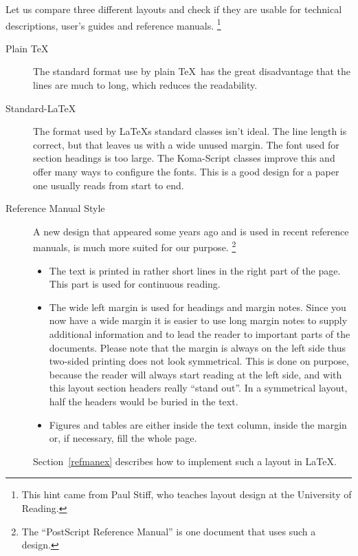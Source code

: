 \documentclass[twoside,a4paper]{refart}
\begin{document}
Let us compare three different layouts and check if they are usable for 
technical descriptions, user's guides and reference manuals.  
\footnote{This hint came from Paul Stiff, who teaches layout design at 
the University of Reading.}

\begin{description}

\item[Plain \TeX]
        The standard format use by plain \TeX\ has the great disadvantage 
        that the lines are much to long, which reduces the readability.
        
\item[Standard-\LaTeX]
        The format used by \LaTeX{}s standard classes isn't ideal. The 
        line length is correct, but that leaves us with a wide unused margin. 
        The font used for section headings is too large. The Koma-Script 
        classes improve this and offer many ways to configure the fonts. 
        This is a good design for a paper one usually reads from start to 
        end.
        
\item[Reference Manual Style]
        A new design that appeared some years ago and is used in recent 
        reference manuals, is much more suited for our purpose.
        \footnote{The ``PostScript Reference Manual'' is one document that 
        uses such a design.}
\begin{itemize}
\item
        The text is printed in rather short lines in the right part of the 
        page. This part is used for continuous reading.
\item
        The wide left margin is used for headings and margin notes. Since 
        you now have a wide margin it is easier to use long margin notes to 
        supply additional information and to lead the reader to important 
        parts of the documents. Please note that the margin is always on the 
        left side thus two-sided printing does not look symmetrical. This is 
        done on purpose, because the reader will always start reading at the 
        left side, and with this layout section headers really ``stand out''. 
        In a symmetrical layout, half the headers would be buried in the text.
\item
        Figures and tables are either inside the text column, inside the
        margin or, if necessary, fill the whole page.
\end{itemize}

Section~\ref{refmanex} describes how to implement such a layout in 
\LaTeX.

\end{description}
\end{document}
